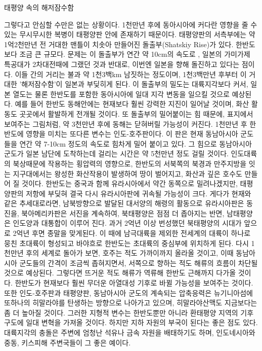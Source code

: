 \documentclass[12pt,a4paper]{book}
\begin{document}
태평양 속의 해저잠수함

그렇다고 안심할 수만은 없는 상황이다. 1천만년 후에 동아시아에 커다란 영향을 줄 수 있는 무시무시한 복병이 태평양판 안에 존재하기 때문이다. 태평양판의 서측부에는 약 1억2천만년 전 거대한 맨틀이 치솟아 만들어진 돌출부(Shatskiy Rise)가 있다. 한반도보다 조금 큰 규모다. 
문제는 이 돌출부가 연간 약 10cm의 속도로 , 일본의 가미가제 특공대가 2차대전때에 그랬던 것과 반대로, 이번엔 일본을 향해 돌진하고 있다는 점이다. 이들 간의 거리는 불과 약 1천3백km 남짓하는 정도이며, 1천3백만년 후부터 이 거대한 '해저잠수함'이 일본과 부딪히게 된다. 이 돌출부의 밀도는 대륙지각보다 커서, 일본 열도는 물론 한반도를 포함한 동아시아에 일대 지각 변동을 일으킬 것으로 예상된다. 예를 들어 한반도 동해안에는 현재보다 훨씬 강력한 지진이 일어날 것이며, 화산 활동도 곳곳에서 활발하게 전개될 것이다. 또 돌출부의 밀어붙이는 힘 때문에, 표지에서 보여주는 그림처럼, 약 3천만년 후에 동해는 닫혀버릴 가능성이 커진다. 
1천만년 후 한반도에 영향을 미치는 또다른 변수는 인도-호주판이다. 이 판은 현재 동남아시아 군도들을 연간 약 7-10cm 정도의 속도로 힘차게 밀어 붙이고 있다. 그 힘으로 동남아시아 군도가 일본 남단에 도착하는데 걸리는 시간은 약 5천만년 정도 걸릴 것이다. 인도대륙의 북상때문에 작용하는 횡압력의 영향으로, 한반도의 서북쪽의 북경과 만주지방을 잇는 지구대에서는 왕성한 화산작용이 발생하여 땅이 벌어지고, 화산과 깊은 호수도 만들어 질 것이다. 한반도는 중국과 함께 유라시아에서 약간 동쪽으로 밀려나겠지만, 태평양판의 저항에 부딪혀 결국 다시 유라시아판에 귀속될 가능성이 크다. 게다가 현재와 같은 추세대로라면, 남북방향으로 발달된 대서양의 해령의 활동으로 유라시아판은 동진을, 북아메리카판은 서진을 계속하여, 북태평양은 점점 더 좁아지는 반면, 남태평양은 인도양과 대통합이 이루어 진다. 과거 2억년 이상 번성했던 북태평양의 시대가 앞으로 2억년 후면 종말을 맞게된다. 이 때에 남극대륙을 제외한 전세계의 대륙이 하나로 뭉친 초대륙이 형성되고 바야흐로 한반도는 초대륙의 중심부에 위치하게 된다. 
다시 1천만년 후의 세계로 돌아가 보면, 호주는 적도 가까이까지 올라올 것이고, 이때 동남아시아 군도들의 간격이 조금씩 좁혀지면서, 서쪽으로 향하는 적도 해류의 흐름이 차단될 것으로 예상된다. 그렇다면 뜨거운 적도 해류가 역류해 한반도 근해까지 다가올 것이다. 한반도가 현재보다 훨씬 무더운 아열대성 기후로 바뀔 가능성을 보여주는 것이다. 또한 인도-호주판과 태평양판, 동남아시아 군도의 계속되는 압축응력은 뉴기니아섬에 또하나의 히말라야를 탄생하는 방향으로 나아가고 있으며, 히말라야산맥도 지금보다는 좀 더 높아질 것이다. 그러한 지형적 변수는 한반도뿐만 아니라 환태평양 지역의 기후 구도에 일대 변혁을 가져올 것이다. 하지만 지하 자원의 부국이 된다는 좋은 점도 있다. 대륙지각의 충돌은 주변에 엄청난 석유나 금속 자원을 배태하기도 하며, 인도네시아와 중동, 키스피해 주변국들이 그 좋은 예이다.
\end{document}
